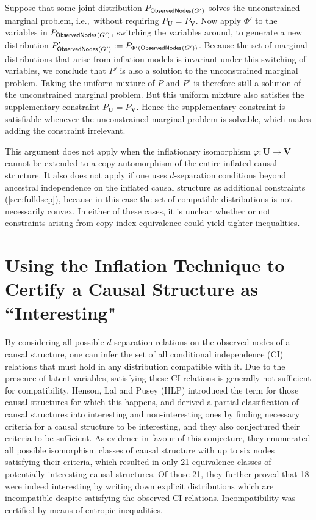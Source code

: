 \documentclass[aps,english,10pt,superscriptaddress,onecolumn,twoside,longbibliography,pra,floatfix,fleqn,nofootinbib]{revtex4-1}
\newcommand*{\tblue}[1]{{\color{MidnightBlue}{\textbf{#1}}}}
\theoremstyle{definition}
\newcommand{\SmallNamedFunction}[3][]{\operatorname{\mathsf{#2}}_{#1}\parenths{#3}}
\newcommand{\obsnodes}[1]{\SmallNamedFunction{ObservedNodes}{#1}}
\DeclarePairedDelimiter{\parenths}{\lparen}{\rparen}
\begin{document}
Suppose that some joint distribution $P_{\obsnodes{G'}}$ solves the unconstrained marginal problem, i.e.,~without requiring $P_{\bm{U}} = P_{\bm{V}}$. Now apply $\Phi'$ to the variables in $P_{\obsnodes{G'}}$, switching the variables around, to generate a new distribution $P'_{\obsnodes{G'}}:=P_{\Phi'(\obsnodes{G'})}$. Because the set of marginal distributions that arise from inflation models is invariant under this switching of variables, we conclude that $P'$ is also a solution to the unconstrained marginal problem. Taking the uniform mixture of $P$ and $P'$ is therefore still a solution of the unconstrained marginal problem. But this uniform mixture also satisfies the supplementary constraint $P_{\bm{U}} = P_{\bm{V}}$. Hence the supplementary constraint is satisfiable whenever the unconstrained marginal problem is solvable, which makes adding the constraint irrelevant.

This argument does not apply when the inflationary isomorphism $\varphi:\bm{U}\to\bm{V}$ cannot be extended to a copy automorphism of the entire inflated causal structure. It also does not apply if one uses $d$-separation conditions beyond ancestral independence on the inflated causal structure as additional constraints (\cref{sec:fulldsep}), because in this case the set of compatible distributions is not necessarily convex.  In either of these cases, it is unclear whether or not constraints arising from copy-index equivalence could yield tighter inequalities. 

\section{Using the Inflation Technique to Certify a Causal Structure as ``Interesting"\label{sec:interestingproof}}

By considering all possible $d$-separation relations on the observed nodes of a causal structure, one can infer the set of all conditional independence (CI) relations that must hold in any distribution compatible with it. Due to the presence of latent variables, satisfying these CI relations 
is generally not sufficient for compatibility. Henson, Lal and Pusey (HLP) \cite{pusey2014gdag} introduced the term \tblue{interesting} for those causal structures for which this happens, and derived a partial classification of causal structures into interesting and non-interesting ones by
finding necessary criteria for a causal structure to be interesting, and they also conjectured their criteria to be sufficient. As evidence in favour of this conjecture, they enumerated all possible isomorphism classes of causal structure with up to six nodes satisfying their criteria, which resulted in only 21 equivalence classes of potentially interesting causal structures. Of those 21, they further proved that 18 were indeed interesting by writing down explicit distributions which are incompatible despite satisfying the observed CI relations. Incompatibility was certified by means of entropic inequalities. 
\end{document}
